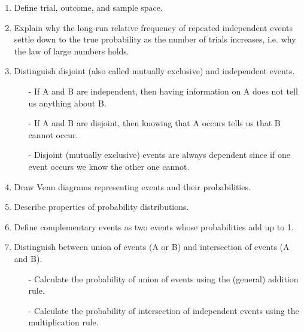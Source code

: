 \documentclass[11pt]{article}
\begin{document}
\begin{enumerate}
\renewcommand\labelenumi{\textcolor{light}{\textbf{LO \theenumi.}}}

\item Define trial, outcome, and sample space.

\item Explain why the long-run relative frequency of repeated independent events settle down to the true probability as the number of trials increases, i.e. why the law of large numbers holds.

\item Distinguish disjoint (also called mutually exclusive) and independent events.
\begin{itemize}
\item[-] If A and B are independent, then having information on A does not tell us anything about B.
\item[-] If A and B are disjoint, then knowing that A occurs tells us that B cannot occur.
\item[-] Disjoint (mutually exclusive) events are always dependent since if one event occurs we know the other one cannot.
\end{itemize}

\item Draw Venn diagrams representing events and their probabilities.

\item Describe properties of probability distributions.

\item Define complementary events as two events whose probabilities add up to 1.

\item Distinguish between union of events (A or B) and intersection of events (A and B).
\begin{itemize}
\item[-] Calculate the probability of union of events using the (general) addition rule.
\item[-] Calculate the probability of intersection of independent events using the multiplication rule.
\end{itemize}

\end{enumerate}
\end{document}

